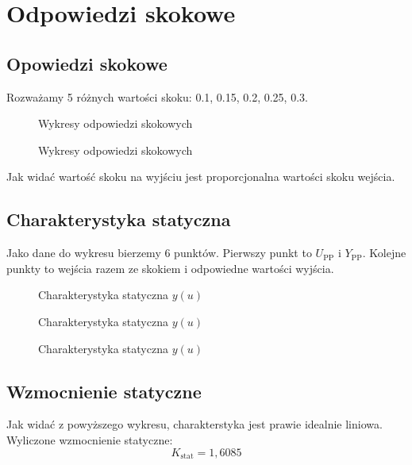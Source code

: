 \chapter{Odpowiedzi skokowe}

\section{Opowiedzi skokowe}
Rozważamy 5 różnych wartości skoku: \num{0,1}, \num{0,15}, \num{0,2}, \num{0,25}, \num{0,3}.

\begin{figure}[H]
\centering

\caption{Wykresy odpowiedzi skokowych}
\end{figure}

\begin{figure}[H]
\centering

\caption{Wykresy odpowiedzi skokowych}
\end{figure}

Jak widać wartość skoku na wyjściu jest proporcjonalna wartości skoku wejścia.

\section{Charakterystyka statyczna}
Jako dane do wykresu bierzemy 6 punktów. Pierwszy punkt to $U_{\mathrm{PP}}$ i $Y_{\mathrm{PP}}$. Kolejne punkty to wejścia razem ze skokiem i odpowiedne wartości wyjścia.

\begin{figure}[H]
\centering

\caption{Charakterystyka statyczna $y(u)$}
\end{figure}

\begin{figure}[H]
\centering

\caption{Charakterystyka statyczna $y(u)$}
\end{figure}

\begin{figure}[H]
\centering

\caption{Charakterystyka statyczna $y(u)$}
\end{figure}
    

\section{Wzmocnienie statyczne}
Jak widać z powyższego wykresu, charakterstyka jest prawie idealnie liniowa. Wyliczone wzmocnienie statyczne:
\begin{equation}
K_{\mathrm{stat}} = 1,6085
\end{equation}
